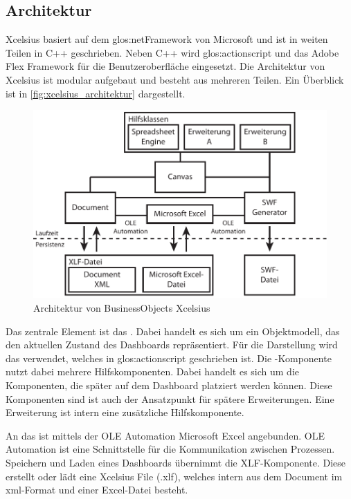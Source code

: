 \begin{onehalfspacing}
\subsection{Architektur}
\gls{Xcelsius} basiert auf dem \gls{glos:netFramework} von Microsoft und ist in weiten Teilen in C++ geschrieben. Neben C++ wird \gls{glos:actionscript} und das Adobe Flex Framework für die  Benutzeroberfläche eingesetzt. Die Architektur von \gls{Xcelsius} ist modular aufgebaut und besteht aus mehreren Teilen. Ein Überblick ist in \vref{fig:xcelsius_architektur} dargestellt.

\begin{figure}[!ht]
\centering
\setlength{\unitlength}{1mm}
\includegraphics[width=15cm]{images/Abbildung5-Architektur-Xcelsius.pdf}
\caption{Architektur von BusinessObjects Xcelsius\label{fig:xcelsius_architektur}}
\end{figure} 

Das zentrale Element ist das . Dabei handelt es sich um ein Objektmodell, das den aktuellen Zustand des Dashboards repräsentiert. Für die Darstellung wird das  verwendet, welches in \gls{glos:actionscript} geschrieben ist. Die -Komponente nutzt dabei mehrere Hilfskomponenten. Dabei handelt es sich um die Komponenten, die später auf dem Dashboard platziert werden können. Diese Komponenten sind ist auch der Ansatzpunkt für spätere Erweiterungen. Eine Erweiterung ist intern eine zusätzliche Hilfskomponente.

An das  ist mittels der OLE Automation Microsoft Excel angebunden. OLE Automation ist eine Schnittstelle für die Kommunikation zwischen Prozessen. Speichern und Laden eines Dashboards übernimmt die XLF-Komponente. Diese erstellt oder lädt eine \gls{Xcelsius} File (.xlf), welches intern aus dem Document im \gls{xml}-Format und einer Excel-Datei besteht.


\end{onehalfspacing}
